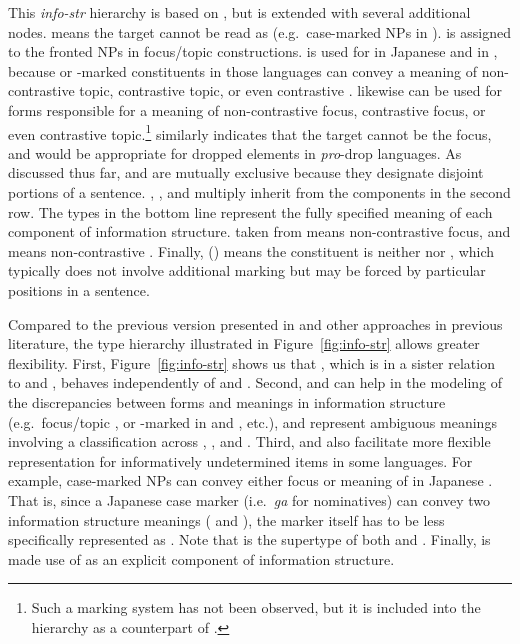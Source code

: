 This \textit{info-str} hierarchy is based on \citet{song:bender:11},
but is extended with several additional nodes. 
 means the target cannot be read as 
(e.g.\ case-marked NPs in ).   is
assigned to the fronted NPs in focus/topic  constructions.
 is used for \wa in Japanese and \nun in
, because \wa or \nun-marked constituents in those
languages can convey a meaning of non-contrastive topic, contrastive
topic, or even contrastive .   likewise
can be used for forms responsible for a meaning of non-contrastive
focus, contrastive focus, or even contrastive topic.\footnote{Such a
  marking system has not been observed, but it is included into the
  hierarchy as a counterpart of .}
 similarly indicates that the target cannot be the
focus, and would be appropriate for dropped elements in
\textit{pro}-drop languages. As discussed thus far,  and
 are mutually exclusive because they designate disjoint
portions of a sentence. , , and 
multiply inherit from the components in the second row.
The types in the bottom line represent the fully specified meaning of each
component of information structure.  taken from
\citet{gundel:99} means non-contrastive focus, and
 means non-contrastive . Finally, 
() means the constituent is neither  nor
, which typically does not involve additional marking but
may be forced by particular positions in a sentence.


Compared to the previous version presented in \citet{song:bender:11}
and other approaches in previous literature, the type hierarchy
illustrated in Figure~\ref{fig:info-str} allows greater
flexibility. First, Figure~\ref{fig:info-str} shows us that
, which is in a sister relation to  and
, behaves independently of  and
. Second,  and 
can help in the modeling of the discrepancies between forms and
meanings in information structure (e.g.\ focus/topic ,
\wa or \nun-marked  in  and , etc.),
and represent ambiguous meanings involving a classification across
, , and .  Third, 
and  also facilitate more flexible representation for
informatively undetermined items in some languages. For example,
case-marked NPs can convey either focus or  meaning of
in Japanese \citep{heycock:94}. That is, since a Japanese case marker
(i.e.\ \textit{ga} for nominatives) can convey two information
structure meanings ( and ), the marker itself has
to be less specifically represented as . Note that
 is the supertype of both  and
. Finally,  is made use of as an explicit component of
information structure.


